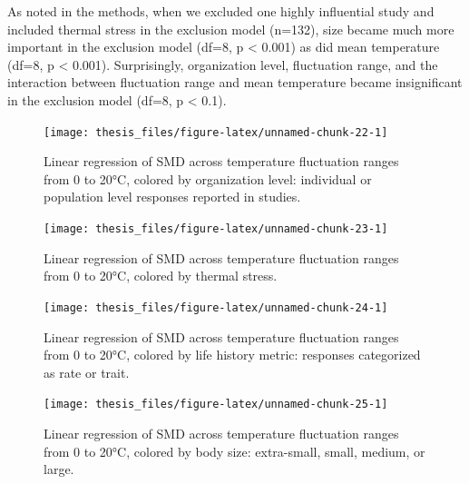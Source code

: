\documentclass[12pt,twoside]{reedthesis}
\begin{document}
As noted in the methods, when we excluded one highly influential study and included thermal stress in the exclusion model (n=132), size became much more important in the exclusion model (df=8, p \textless{} 0.001) as did mean temperature (df=8, p \textless{} 0.001). Surprisingly, organization level, fluctuation range, and the interaction between fluctuation range and mean temperature became insignificant in the exclusion model (df=8, p \textless{} 0.1).
\begin{figure}

{\centering \texttt{[image: thesis\_files/figure-latex/unnamed-chunk-22-1]} 

}

\caption[Effect sizes across temperature range by organization level]{Linear regression of SMD across temperature fluctuation ranges from 0 to 20°C, colored by organization level: individual or population level responses reported in studies.}\label{fig:unnamed-chunk-22}
\end{figure}
\clearpage
\begin{figure}

{\centering \texttt{[image: thesis\_files/figure-latex/unnamed-chunk-23-1]} 

}

\caption[Effect sizes across temperature range by thermal stress]{Linear regression of SMD across temperature fluctuation ranges from 0 to 20°C, colored by thermal stress.}\label{fig:unnamed-chunk-23}
\end{figure}
\begin{figure}

{\centering \texttt{[image: thesis\_files/figure-latex/unnamed-chunk-24-1]} 

}

\caption[Effect sizes across temperature range by response type]{Linear regression of SMD across temperature fluctuation ranges from 0 to 20°C, colored by life history metric: responses categorized as rate or trait.}\label{fig:unnamed-chunk-24}
\end{figure}
\begin{figure}

{\centering \texttt{[image: thesis\_files/figure-latex/unnamed-chunk-25-1]} 

}

\caption[Effect sizes across temperature range by body size]{Linear regression of SMD across temperature fluctuation ranges from 0 to 20°C, colored by body size: extra-small, small, medium, or large.}\label{fig:unnamed-chunk-25}
\end{figure}
\end{document}
